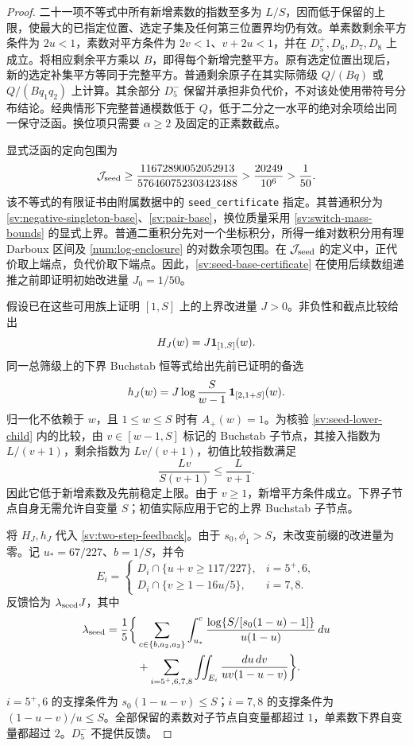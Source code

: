 \begin{proof}
二十一项不等式中所有新增素数的指数至多为 $L/S$，因而低于保留的上限，使最大的已指定位置、选定子集及任何第三位置界均仍有效。单素数剩余平方条件为 $2u<1$，素数对平方条件为 $2v<1$、$v+2u<1$，并在 $D_5^+,D_6,D_7,D_8$ 上成立。将相应剩余平方乘以 $B$，即得每个新增完整平方。原有选定位置出现后，新的选定补集平方等同于完整平方。普通剩余原子在其实际筛级 $Q/(Bq)$ 或 $Q/(Bq_1q_2)$ 上计算。其余部分 $D_5^-$ 保留并承担非负代价，不对该处使用带符号分布结论。经典情形下完整普通模数低于 $Q$，低于二分之一水平的绝对余项给出同一保守泛函。换位项只需要 $\alpha\ge2$ 及固定的正素数截点。

显式泛函的定向包围为
\begin{equation}\label{sv:seed-base-certificate}
 \mathcal J_{\rm seed}\ge
 \frac{11672890052052913}{576460752303423488}
 >\frac{20249}{10^6}>\frac1{50}.
\end{equation}
该不等式的有限证书由附属数据中的 \texttt{seed\_certificate} 指定。其普通积分为 \eqref{sv:negative-singleton-base}、\eqref{sv:pair-base}，换位质量采用 \eqref{sv:switch-mass-bounds} 的显式上界。普通二重积分先对一个坐标积分，所得一维对数积分用有理 Darboux 区间及 \eqref{num:log-enclosure} 的对数余项包围。在 $\mathcal J_{\rm seed}$ 的定义中，正代价取上端点，负代价取下端点。因此，\eqref{sv:seed-base-certificate} 在使用后续数组递推之前即证明初始改进量 $J_0=1/50$。

假设已在这些可用族上证明 $[1,S]$ 上的上界改进量 $J>0$。非负性和截点比较给出
\[
 H_J(w)=J\mathbf 1_{[1,S]}(w).
\]
同一总筛级上的下界 Buchstab 恒等式给出先前已证明的备选
\begin{equation}\label{sv:seed-lower-child}
 h_J(w)=J\log\frac{S}{w-1}\,
                    \mathbf 1_{[2,1+S]}(w).
\end{equation}
归一化不依赖于 $w$，且 $1\le w\le S$ 时有 $A_+(w)=1$。为核验 \eqref{sv:seed-lower-child} 内的比较，由 $v\in[w-1,S]$ 标记的 Buchstab 子节点，其接入指数为 $L/(v+1)$，剩余指数为 $Lv/(v+1)$，初值比较指数满足
\[
 \frac{Lv}{S(v+1)}\le\frac{L}{v+1}.
\]
因此它低于新增素数及先前稳定上限。由于 $v\ge1$，新增平方条件成立。下界子节点自身无需允许自变量 $S$；初值实际应用于它的上界 Buchstab 子节点。

将 $H_J,h_J$ 代入 \eqref{sv:two-step-feedback}。由于 $s_0,\phi_1>S$，未改变前缀的改进量为零。记 $u_*=67/227$、$b=1/S$，并令
\[
 E_i=\begin{cases}
 D_i\cap\{u+v\ge117/227\},&i=5^+,6,\\
 D_i\cap\{v\ge1-16u/5\},&i=7,8.
 \end{cases}
\]
反馈恰为 $\lambda_{\rm seed} J$，其中
\begin{align}\label{sv:seed-feedback-integral}
 \lambda_{\rm seed}=\frac15\bigg\{&
 \sum_{c\in\{b,a_2,a_3\}}
 \int_{u_*}^{c}
 \frac{\log\{S/[s_0(1-u)-1]\}}{u(1-u)}\,du\notag\\
 &+\sum_{i=5^+,6,7,8}\iint_{E_i}
                     \frac{du\,dv}{uv(1-u-v)}\bigg\}.
\end{align}
$i=5^+,6$ 的支撑条件为 $s_0(1-u-v)\le S$；$i=7,8$ 的支撑条件为 $(1-u-v)/u\le S$。全部保留的素数对子节点自变量都超过 $1$，单素数下界自变量都超过 $2$。$D_5^-$ 不提供反馈。


\end{proof}

